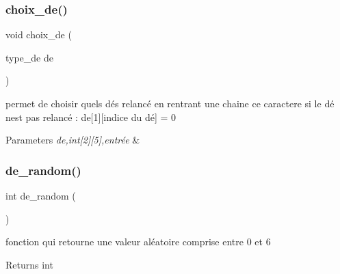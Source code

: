 \subsubsection{\texorpdfstring{choix\+\_\+de()}{choix\_de()}}
{\footnotesize\ttfamily void choix\+\_\+de (\begin{DoxyParamCaption}\item[{type\+\_\+de}]{de }\end{DoxyParamCaption})}



permet de choisir quels dés relancé en rentrant une chaine ce caractere si le dé n\textquotesingle{}est pas relancé \+: de\mbox{[}1\mbox{]}\mbox{[}indice du dé\mbox{]} = 0 


\begin{DoxyParams}{Parameters}
{\em de,int\mbox{[}2\mbox{]}\mbox{[}5\mbox{]},entrée} & \\
\hline
\end{DoxyParams}
\mbox{\label{yams___cleo___martin-_colleu__2_80_8c_a9f85afcdbd64730f976350802b5139de}} 
\subsubsection{\texorpdfstring{de\+\_\+random()}{de\_random()}}
{\footnotesize\ttfamily int de\+\_\+random (\begin{DoxyParamCaption}{ }\end{DoxyParamCaption})}



fonction qui retourne une valeur aléatoire comprise entre 0 et 6 

\begin{DoxyReturn}{Returns}
int 
\end{DoxyReturn}
\mbox{\label{yams___cleo___martin-_colleu__2_80_8c_acade0b64e6667900df67784719f6d91b}} 
